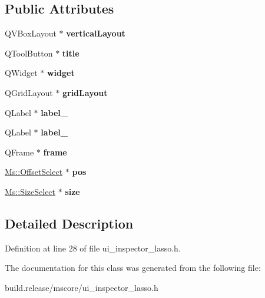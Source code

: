 \subsection*{Public Attributes}
\begin{DoxyCompactItemize}
\item 
\mbox{\label{class_ui___inspector_lasso_a1abca44c389dc9ced394afb1f3b53d72}} 
Q\+V\+Box\+Layout $\ast$ {\bfseries vertical\+Layout}
\item 
\mbox{\label{class_ui___inspector_lasso_a3ed1f51686c0de86d56f62c880e27581}} 
Q\+Tool\+Button $\ast$ {\bfseries title}
\item 
\mbox{\label{class_ui___inspector_lasso_a3018dbd84a50125967aeec515432d54c}} 
Q\+Widget $\ast$ {\bfseries widget}
\item 
\mbox{\label{class_ui___inspector_lasso_a249dd335963de35b06fbc613b8e6c806}} 
Q\+Grid\+Layout $\ast$ {\bfseries grid\+Layout}
\item 
\mbox{\label{class_ui___inspector_lasso_a03f59e23d57d021fc17d727975e9c6b3}} 
Q\+Label $\ast$ {\bfseries label\+\_}
\item 
\mbox{\label{class_ui___inspector_lasso_a5935773b52238139e7af10e47cb95b0a}} 
Q\+Label $\ast$ {\bfseries label\+\_}
\item 
\mbox{\label{class_ui___inspector_lasso_a5193425b98fc9de90aec1e18ff63a37f}} 
Q\+Frame $\ast$ {\bfseries frame}
\item 
\mbox{\label{class_ui___inspector_lasso_ab20bbd632827ba7cb79c21200144303a}} 
\hyperlink{class_ms_1_1_offset_select}{Ms\+::\+Offset\+Select} $\ast$ {\bfseries pos}
\item 
\mbox{\label{class_ui___inspector_lasso_ade6e88dac00e0f1fb06e7acf585e67d3}} 
\hyperlink{class_ms_1_1_size_select}{Ms\+::\+Size\+Select} $\ast$ {\bfseries size}
\end{DoxyCompactItemize}


\subsection{Detailed Description}


Definition at line 28 of file ui\+\_\+inspector\+\_\+lasso.\+h.



The documentation for this class was generated from the following file\+:\begin{DoxyCompactItemize}
\item 
build.\+release/mscore/ui\+\_\+inspector\+\_\+lasso.\+h\end{DoxyCompactItemize}
